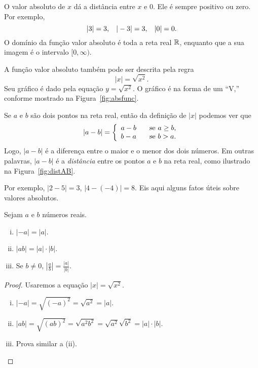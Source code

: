 \documentclass{svmono}
\begin{document}
O valor absoluto de $x$ dá a distância entre $x$ e $0$. Ele
é sempre positivo ou zero. Por exemplo,
\[
  |3| = 3, \hspace{2ex} |-3| = 3, \hspace{2ex} |0| = 0.
\]
O domínio da função valor absoluto é toda a reta real $\mathbb{R}$,
enquanto que a sua imagem é o intervalo $[0,\infty)$.

A função valor absoluto também pode ser descrita pela regra
\[
  |x| = \sqrt{x^2}.
\]
Seu gráfico é dado pela equação $y = \sqrt{x^2}$. O gráfico é
na forma de um ``V,'' conforme mostrado na Figura~\ref{fig:absfunc}.


Se $a$ e $b$ são dois pontos na reta real, então da definição
de $|x|$ podemos ver que
\[
  |a - b| = \left\{
            \begin{array}{r l}
              a - b & \hspace{2ex} \text{se } a \ge b, \\
              b - a & \hspace{2ex} \text{se } b > a.
            \end{array}
            \right.
\]
Logo, $|a-b|$ é a diferença entre o maior e o menor
dos dois números. Em outras palavras, $|a-b|$ é a
\emph{distância} entre os pontos $a$ e $b$ na reta real,
como ilustrado na Figura~\ref{fig:distAB}.


Por exemplo, $|2-5| = 3$, $|4 - (-4)| = 8$. Eis aqui alguns
fatos úteis sobre valores absolutos.

\begin{theorem}
\label{theo:absvalues}
Sejam $a$ e $b$ números reais.
\begin{enumerate}[(i)]
  \item $|-a| = |a|$.
  \item $|ab| = |a|\cdot|b|$.
  \item Se $b \ne 0$, $\displaystyle\left|\frac{a}{b}\right| = \frac{|a|}{|b|}$.
\end{enumerate}
\end{theorem}

\begin{proof}
Usaremos a equação $|x| = \sqrt{x^2}$.
\begin{enumerate}[(i)]
  \item $|-a| = \sqrt{(-a)^2} = \sqrt{a^2} = |a|.$
  \item $|ab| = \sqrt{(ab)^2} = \sqrt{a^2b^ 2} = \sqrt{a^2}\sqrt{b^2}
         = |a|\cdot|b|.$
  \item Prova similar a (ii).
\end{enumerate}
\end{proof}
\end{document}
